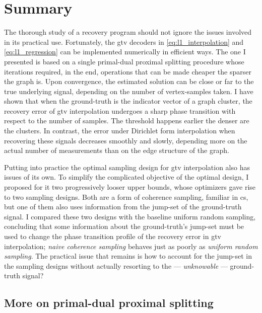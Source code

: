 \section{Summary}

The thorough study of a recovery program should not ignore the issues involved in its practical use. Fortunately, the \acrshort{gtv} decoders in \eqref{eq:l1_interpolation} and \eqref{eq:l1_regression} can be implemented numerically in efficient ways. The one I presented is based on a single primal-dual proximal splitting procedure whose iterations required, in the end, operations that can be made cheaper the sparser the graph is. Upon convergence, the estimated solution can be close or far to the true underlying signal, depending on the number of vertex-samples taken. I have shown that when the ground-truth is the indicator vector of a graph cluster, the recovery error of \acrshort{gtv} interpolation undergoes a sharp phase transition with respect to the number of samples. The threshold happens earlier the denser are the clusters. In contrast, the error under Dirichlet form interpolation when recovering these signals decreases smoothly and slowly, depending more on the actual number of measurements than on the edge structure of the graph.

Putting into practice the optimal sampling design for \acrshort{gtv} interpolation also has issues of its own. To simplify the complicated objective of the optimal design, I proposed for it two progressively looser upper bounds, whose optimizers gave rise to two sampling designs. Both are a form of coherence sampling, familiar in \acrlong{cs}, but one of them also uses information from the jump-set of the ground-truth signal. I compared these two designs with the baseline uniform random sampling, concluding that some information about the ground-truth's jump-set must be used to change the phase transition profile of the recovery error in \acrshort{gtv} interpolation; \emph{naive coherence sampling} behaves just as poorly as \emph{uniform random sampling}. The practical issue that remains is how to account for the jump-set in the sampling designs without actually resorting to the --- \emph{unknowable} --- ground-truth signal?

\clearpage

\begin{subappendices}
    \section{More on primal-dual proximal splitting}\label{ap:primal_dual_prox_split}
    
\end{subappendices}